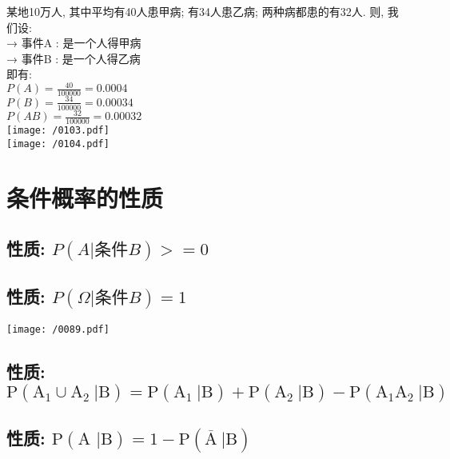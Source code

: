 \documentclass[UTF8]{ctexart}
\begin{document}
	
	
	
	\begin{myEnvSample}
		某地10万人, 其中平均有40人患甲病; 有34人患乙病; 两种病都患的有32人. 		则, 我们设: \\
		→ 事件A : 是一个人得甲病 \\
		→ 事件B : 是一个人得乙病 \\
		
		即有: \\
		$		P(A)=\frac{40}{100000}=0.0004		$ \\
		$		P(B)=\frac{34}{100000}=0.00034		$ \\
		$		P(AB)=\frac{32}{100000}=0.00032		$ \\
		\texttt{[image: /0103.pdf]} \\
		\texttt{[image: /0104.pdf]} 	
	\end{myEnvSample}
	
	
	

	
	\section{条件概率的性质}
	
	\subsection{性质: $ P(A | \text{条件}B) >= 0$}
	
	
	\subsection{性质: $ P(\Omega | \text{条件}B) = 1$}
	
	\texttt{[image: /0089.pdf]}
	
	
	\subsection{性质: $ \text{P}\left( \text{A}_1\cup \text{A}_2\ |\text{B} \right) =\text{P}\left( \text{A}_1\ |\text{B} \right) +\text{P}\left( \text{A}_2\ |\text{B} \right) -\text{P}\left( \text{A}_1\text{A}_2\ |\text{B} \right) 		$}
	
	\subsection{性质: $	\text{P}\left( \text{A\ |B} \right) =1-\text{P}\left( \overline{\text{A}}\ |\text{B} \right) 	$}
	
\end{document}
